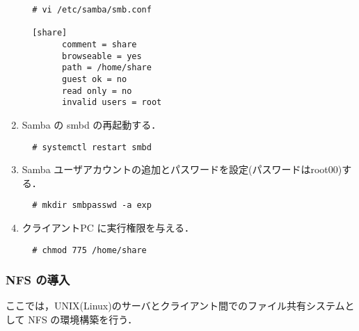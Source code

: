 \documentclass[a4j,titlepage]{jarticle}
\begin{document}
\begin{enumerate}
  \begin{center}
    \begin{screen}
\begin{verbatim}
  # vi /etc/samba/smb.conf

  [share]
        comment = share
        browseable = yes
        path = /home/share
        guest ok = no
        read only = no
        invalid users = root
\end{verbatim}
    \end{screen}
    \end{center}

    \item Samba の smbd の再起動する．
      
  \begin{center}
    \begin{screen}
\begin{verbatim}
  # systemctl restart smbd
\end{verbatim}
    \end{screen}
    \end{center}

    \item Samba ユーザアカウントの追加とパスワードを設定(パスワードはroot00)する．

  \begin{center}
    \begin{screen}
\begin{verbatim}
  # mkdir smbpasswd -a exp
\end{verbatim}
    \end{screen}
    \end{center}

    \item クライアントPC に実行権限を与える．

  \begin{center}
    \begin{screen}
\begin{verbatim}
  # chmod 775 /home/share
\end{verbatim}
    \end{screen}
    \end{center}

\end{enumerate}

    \subsubsection{NFS の導入}
    ここでは，UNIX(Linux)のサーバとクライアント間でのファイル共有システムとして NFS の環境構築を行う．
\end{document}
